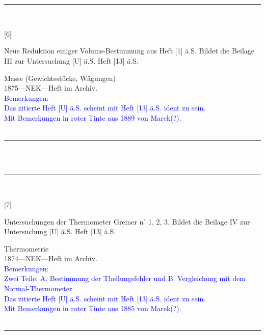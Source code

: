 \\
\vspace*{-2.5pt}\\
\parbox{\textwidth}{%
\rule{\textwidth}{1pt}\vspace*{-3mm}\\
\begin{minipage}[t]{0.1\textwidth}\vspace{0pt}
\Huge\rule[-4mm]{0cm}{1cm}[6]
\end{minipage}
\hfill
\begin{minipage}[t]{0.9\textwidth}\vspace{0pt}
\large Neue Reduktion einiger Volums-Bestimmung aus Heft [1] ä.S. Bildet die Beilage III zur Untersuchung [U] ä.S. Heft [13] ä.S.\rule[-2mm]{0mm}{2mm}
\end{minipage}
{\footnotesize\flushright
Masse (Gewichtsstücke, Wägungen)\\
}
1875\quad---\quad NEK\quad---\quad Heft im Archiv.\\
\textcolor{blue}{Bemerkungen:\\{}
Das zitierte Heft [U] ä.S. scheint mit Heft [13] ä.S. ident zu sein.\\{}
Mit Bemerkungen in roter Tinte aus 1889 von Marek(?).\\{}
}
\\[-15pt]
\rule{\textwidth}{1pt}
}
\\
\vspace*{-2.5pt}\\
\parbox{\textwidth}{%
\rule{\textwidth}{1pt}\vspace*{-3mm}\\
\begin{minipage}[t]{0.1\textwidth}\vspace{0pt}
\Huge\rule[-4mm]{0cm}{1cm}[7]
\end{minipage}
\hfill
\begin{minipage}[t]{0.9\textwidth}\vspace{0pt}
\large Untersuchungen der Thermometer Greiner n{$^\circ$} 1, 2, 3. Bildet die Beilage IV zur Untersuchung [U] ä.S. Heft [13] ä.S.\rule[-2mm]{0mm}{2mm}
\end{minipage}
{\footnotesize\flushright
Thermometrie\\
}
1874\quad---\quad NEK\quad---\quad Heft im Archiv.\\
\textcolor{blue}{Bemerkungen:\\{}
Zwei Teile: A. Bestimmung der Theilungsfehler und B. Vergleichung mit dem Normal-Thermometer.\\{}
Das zitierte Heft [U] ä.S. scheint mit Heft [13] ä.S. ident zu sein.\\{}
Mit Bemerkungen in roter Tinte aus 1885 von Marek(?).\\{}
}
\\[-15pt]
\rule{\textwidth}{1pt}
}
